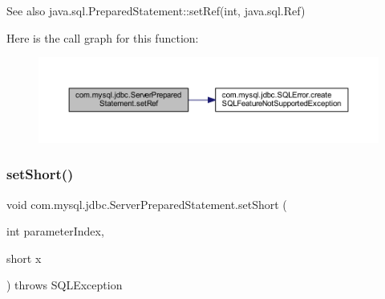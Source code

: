 \begin{DoxySeeAlso}{See also}
java.\+sql.\+Prepared\+Statement\+::set\+Ref(int, java.\+sql.\+Ref) 
\end{DoxySeeAlso}
Here is the call graph for this function\+:
\nopagebreak
\begin{figure}[H]
\begin{center}
\leavevmode
\includegraphics[width=350pt]{classcom_1_1mysql_1_1jdbc_1_1_server_prepared_statement_a5f91135ca91172666ffc7998eb6ee95c_cgraph}
\end{center}
\end{figure}
\mbox{\label{classcom_1_1mysql_1_1jdbc_1_1_server_prepared_statement_ae6a2fa994a7c41fb1b5afa5826e1e447}} 
\subsubsection{\texorpdfstring{set\+Short()}{setShort()}}
{\footnotesize\ttfamily void com.\+mysql.\+jdbc.\+Server\+Prepared\+Statement.\+set\+Short (\begin{DoxyParamCaption}\item[{int}]{parameter\+Index,  }\item[{short}]{x }\end{DoxyParamCaption}) throws S\+Q\+L\+Exception}

